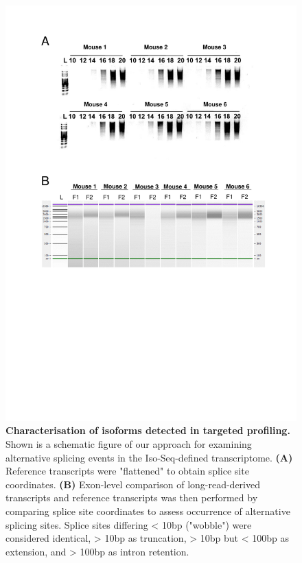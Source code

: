 \begin{figure}[htp]
	\centering
	\includegraphics[page=7,trim={0cm 3cm 0cm 0cm},clip,scale = 0.75]{Figures/TargetedTranscriptome_LabResults}
	\captionsetup{width=0.95\textwidth,singlelinecheck=off}
	\caption[Characterisation of isoforms detected in targeted profiling]%
	{\textbf{Characterisation of isoforms detected in targeted profiling.} Shown is a schematic figure of our approach for examining alternative splicing events in the Iso-Seq-defined transcriptome. \textbf{(A)} Reference transcripts were "flattened" to obtain splice site coordinates. \textbf{(B)} Exon-level comparison of long-read-derived transcripts and reference transcripts was then performed by comparing splice site coordinates to assess occurrence of alternative splicing sites. Splice sites differing < 10bp ("wobble") were considered identical, > 10bp as truncation, > 10bp but < 100bp as extension, and > 100bp as intron retention.  
	}
	\label{fig:Targeted_isoforms_annotate}
\end{figure}

